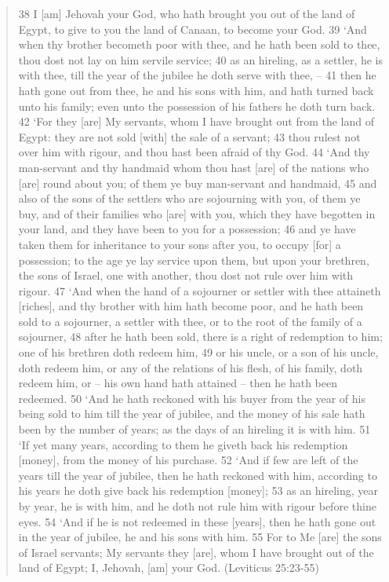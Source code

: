 \documentclass[11pt]{article}
\begin{document}
{\begin{quote}
38 I [am] Jehovah your God, who hath brought you out of the land of Egypt, to give to you the land of Canaan, to become your God.
39 `And when thy brother becometh poor with thee, and he hath been sold to thee, thou dost not lay on him servile service;
40 as an hireling, as a settler, he is with thee, till the year of the jubilee he doth serve with thee, --
41 then he hath gone out from thee, he and his sons with him, and hath turned back unto his family; even unto the possession of his fathers he doth turn back.
42 `For they [are] My servants, whom I have brought out from the land of Egypt: they are not sold [with] the sale of a servant;
43 thou rulest not over him with rigour, and thou hast been afraid of thy God.
44 `And thy man-servant and thy handmaid whom thou hast [are] of the nations who [are] round about you; of them ye buy man-servant and handmaid,
45 and also of the sons of the settlers who are sojourning with you, of them ye buy, and of their families who [are] with you, which they have begotten in your land, and they have been to you for a possession;
46 and ye have taken them for inheritance to your sons after you, to occupy [for] a possession; to the age ye lay service upon them, but upon your brethren, the sons of Israel, one with another, thou dost not rule over him with rigour.
47 `And when the hand of a sojourner or settler with thee attaineth [riches], and thy brother with him hath become poor, and he hath been sold to a sojourner, a settler with thee, or to the root of the family of a sojourner,
48 after he hath been sold, there is a right of redemption to him; one of his brethren doth redeem him,
49 or his uncle, or a son of his uncle, doth redeem him, or any of the relations of his flesh, of his family, doth redeem him, or -- his own hand hath attained -- then he hath been redeemed.
50 `And he hath reckoned with his buyer from the year of his being sold to him till the year of jubilee, and the money of his sale hath been by the number of years; as the days of an hireling it is with him.
51 `If yet many years, according to them he giveth back his redemption [money], from the money of his purchase.
52 `And if few are left of the years till the year of jubilee, then he hath reckoned with him, according to his years he doth give back his redemption [money];
53 as an hireling, year by year, he is with him, and he doth not rule him with rigour before thine eyes.
54 `And if he is not redeemed in these [years], then he hath gone out in the year of jubilee, he and his sons with him.
55 For to Me [are] the sons of Israel servants; My servants they [are], whom I have brought out of the land of Egypt; I, Jehovah, [am] your God. (Leviticus 25:23-55)
\end{quote} 

}
\end{document}
